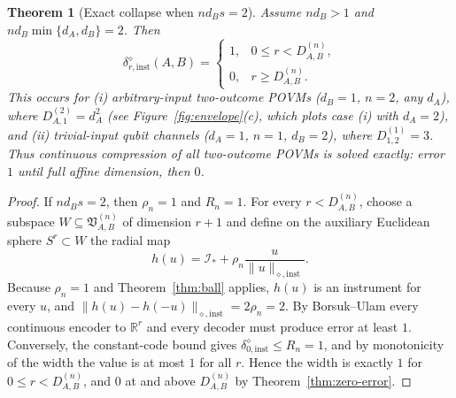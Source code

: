\documentclass[11pt,a4paper]{article}
\newtheorem{theorem}{Theorem}[section]
\begin{document}
\begin{theorem}[Exact collapse when $nd_Bs=2$]
\label{thm:collapse}
Assume $nd_B>1$ and $nd_B\min\{d_A,d_B\}=2$. Then
\[
\delta_{r,\mathrm{inst}}^{\diamond}(A,B)=
\begin{cases}
1,&0\le r<D_{A,B}^{(n)},\\
0,&r\ge D_{A,B}^{(n)}.
\end{cases}
\]
This occurs for (i) arbitrary-input two-outcome POVMs ($d_B=1$, $n=2$, any $d_A$), where $D_{A,1}^{(2)}=d_A^2$ (see Figure~\ref{fig:envelope}(c), which plots case (i) with $d_A=2$), and (ii) trivial-input qubit channels ($d_A=1$, $n=1$, $d_B=2$), where $D_{1,2}^{(1)}=3$. Thus continuous compression of all two-outcome POVMs is solved exactly: error $1$ until full affine dimension, then $0$.
\end{theorem}

\begin{proof}
If $nd_Bs=2$, then $\rho_n=1$ and $R_n=1$. For every $r<D_{A,B}^{(n)}$, choose a subspace $W\subseteq\mathfrak V_{A,B}^{(n)}$ of dimension $r+1$ and define on the auxiliary Euclidean sphere $S^r\subset W$ the radial map
\[
h(u)=\mathcal I_*+\rho_n\frac{u}{\|u\|_{\diamond,\mathrm{inst}}}.
\]
Because $\rho_n=1$ and Theorem~\ref{thm:ball} applies, $h(u)$ is an instrument for every $u$, and $\|h(u)-h(-u)\|_{\diamond,\mathrm{inst}}=2\rho_n=2$. By Borsuk--Ulam every continuous encoder to $\mathbb R^r$ and every decoder must produce error at least $1$. Conversely, the constant-code bound gives $\delta_{0,\mathrm{inst}}^{\diamond}\le R_n=1$, and by monotonicity of the width the value is at most $1$ for all $r$. Hence the width is exactly $1$ for $0\le r<D_{A,B}^{(n)}$, and $0$ at and above $D_{A,B}^{(n)}$ by Theorem~\ref{thm:zero-error}.
\end{proof}
\end{document}
